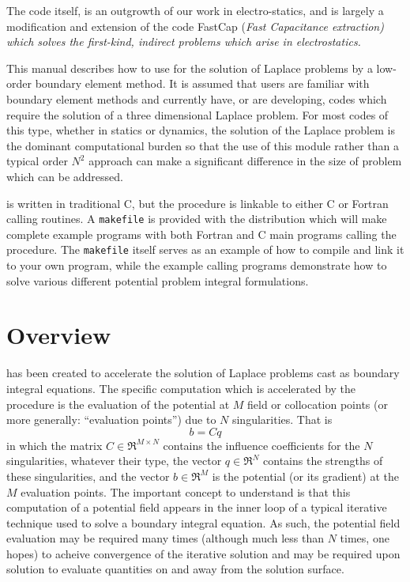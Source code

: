 The \fas code itself, is an outgrowth of our work in electro-statics, 
and is largely a modification and extension of the code FastCap 
(\it Fast Cap\rm acitance extraction) \cite{nabors91} which solves  
the first-kind, indirect problems which arise in electrostatics.

This manual describes how to use \fas for the solution 
of Laplace problems by a  low-order boundary element 
method.  It is assumed that users are familiar with boundary element
methods and currently have, or are developing, codes which require the
solution of a three dimensional Laplace problem.  For most codes of this
type, whether in statics or dynamics, the solution of the Laplace problem
is the dominant computational burden so that the use of this module 
rather than a typical order $N^2$ approach can make a significant 
difference in the size of problem which can be addressed.

\fas is written in traditional C, but the procedure is linkable to either 
C or Fortran calling routines.  A 
{\tt makefile} is provided with the distribution which will make
complete example programs with both Fortran and C main programs calling the
\fas procedure.  The {\tt makefile} itself serves as an example of how to 
compile \fas and link it to your own program, while the example calling
programs demonstrate how to solve various different potential problem
integral formulations.

\newpage
\section{\fas Overview}
\label{s:over}
\fas has been created to accelerate the solution of Laplace problems
cast as boundary integral equations.  
The specific computation which is accelerated by the \fas procedure 
is the evaluation of the potential at $M$ field or collocation points
(or more generally: ``evaluation points'') due to $N$ singularities.  That is
\begin{equation}
\label{eq:field}
b=Cq
\end{equation}
in which the matrix $C\in \Re^{M\times N}$ contains the influence 
coefficients for the $N$ 
singularities, whatever their type, the vector $q\in \Re^N$ contains 
the strengths 
of these singularities, and the vector $b\in \Re^M$ is the potential 
(or its gradient) 
at the $M$ evaluation points.  The important concept to understand is that
this computation of a potential field appears in the inner loop of
a typical iterative technique used to solve a boundary integral 
equation.  As such, the potential field evaluation may be required
many times (although much less than $N$ times, one hopes) to acheive 
convergence of the iterative solution and may be required upon solution to 
evaluate quantities on and away from the solution surface.

